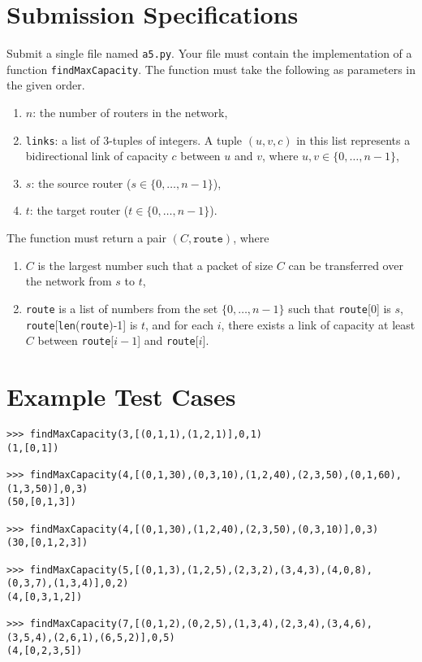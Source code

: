 \documentclass{article}
\begin{document}
\section*{Submission Specifications}
Submit a single file named \texttt{a5.py}. Your file must contain the implementation of a function \texttt{findMaxCapacity}. The function must take the following as parameters in the given order.
\begin{enumerate}
    \item $n$: the number of routers in the network,
    \item \texttt{links}: a list of 3-tuples of integers. A tuple $(u, v, c)$ in this list represents a bidirectional link of capacity $c$ between $u$ and $v$, where $u, v \in \{0, \dots, n-1\}$,
    \item $s$: the source router ($s \in \{0, \dots, n-1\}$),
    \item $t$: the target router ($t \in \{0, \dots, n-1\}$).
\end{enumerate}

The function must return a pair $(C, \texttt{route})$, where
\begin{enumerate}
    \item $C$ is the largest number such that a packet of size $C$ can be transferred over the network from $s$ to $t$,
    \item \texttt{route} is a list of numbers from the set $\{0, \dots, n-1\}$ such that \texttt{route}[0] is $s$, \texttt{route}[\texttt{len}(\texttt{route})-1] is $t$, and for each $i$, there exists a link of capacity at least $C$ between \texttt{route}[$i-1$] and \texttt{route}[$i$].
\end{enumerate}

\section*{Example Test Cases}
\begin{verbatim}
>>> findMaxCapacity(3,[(0,1,1),(1,2,1)],0,1)
(1,[0,1])

>>> findMaxCapacity(4,[(0,1,30),(0,3,10),(1,2,40),(2,3,50),(0,1,60),(1,3,50)],0,3)
(50,[0,1,3])

>>> findMaxCapacity(4,[(0,1,30),(1,2,40),(2,3,50),(0,3,10)],0,3)
(30,[0,1,2,3])

>>> findMaxCapacity(5,[(0,1,3),(1,2,5),(2,3,2),(3,4,3),(4,0,8),(0,3,7),(1,3,4)],0,2)
(4,[0,3,1,2])

>>> findMaxCapacity(7,[(0,1,2),(0,2,5),(1,3,4),(2,3,4),(3,4,6),(3,5,4),(2,6,1),(6,5,2)],0,5)
(4,[0,2,3,5])
\end{verbatim}


\thispagestyle{plain}
\end{document}
